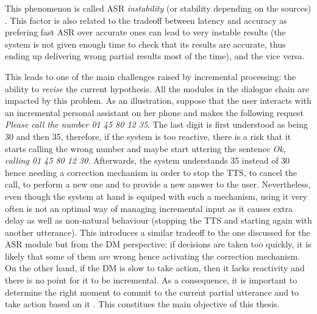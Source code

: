                 This phenomenon is called ASR \textit{instability} (or stability depending on the sources) \cite{Selfridge2011}. This factor is also related to the tradeoff between latency and accuracy as prefering fast ASR over accurate ones can lead to very instable results (the system is not given enough time to check that its results are accurate, thus ending up delivering wrong partial results most of the time), and the vice versa.
								
		This leads to one of the main challenges raised by incremental processing: the ability to \textit{revise} the current hypothesis. All the modules in the dialogue chain are impacted by this problem. As an illustration, suppose that the user interacts with an incremental personal assistant on her phone and makes the following request \textit{Please call the number 01 45 80 12 35}. The last digit is first understood as being 30 and then 35, therefore, if the system is too reactive, there is a risk that it starts calling the wrong number and maybe start uttering the sentence \textit{Ok, calling 01 45 80 12 30}. Afterwards, the system understands 35 instead of 30 hence needing a correction mechanism in order to stop the TTS, to cancel the call, to perform a new one and to provide a new answer to the user. Nevertheless, even though the system at hand is equiped with such a mechanism, using it very often is not an optimal way of managing incremental input as it causes extra delay as well as non-natural behaviour (stopping the TTS and starting again with another utterance). This introduces a similar tradeoff to the one discussed for the ASR module but from the DM perspective: if decisions are taken too quickly, it is likely that some of them are wrong hence activating the correction mechanism. On the other hand, if the DM is slow to take action, then it lacks reactivity and there is no point for it to be incremental. As a consequence, it is important to determine the right moment to commit to the current partial utterance and to take action based on it \cite{Raux2008,Lu2011}. This constitues the main objective of this thesis.

